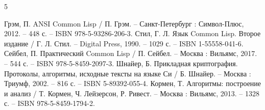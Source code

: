 \newpage
{}

\begin{thebibliography}{5}
	
	 Грэм, П. ANSI Common Lisp / П. Грэм. – Санкт-Петербург : Символ-Плюс, 2012. – 448 с. – ISBN 978-5-93286-206-3.
	 Стил, Г. Л. Язык Common Lisp. Второе издание / Г. Л. Стил. – Digital Press, 1990. – 1029 с. – ISBN 1-55558-041-6.
	 Сейбел, П. Практический Common Lisp / П. Сейбел. – Москва : Вильямс, 2017. – 544 с. – ISBN 978-5-8459-2097-3.
	 Шнайер, Б. Прикладная криптография. Протоколы, алгоритмы, исходные тексты на языке Си / Б. Шнайер. – Москва : Триумф, 2002. – 816 с. – ISBN 5-89392-055-4.
	 Кормен, Т. Алгоритмы: построение и анализ / Т. Кормен, Ч. Лейзерсон, Р. Ривест. – Москва : Вильямс, 2013. – 1328 с. – ISBN 978-5-8459-1794-2.
	
\end{thebibliography}
